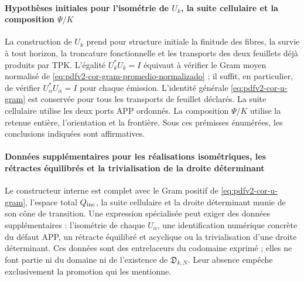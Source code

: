 \paragraph{Hypothèses initiales pour l'isométrie de \(U_k\), la suite cellulaire et la composition \(\Psi/K\)}
La construction de \(U_k\) prend pour structure initiale la finitude des fibres, la survie à tout horizon, la troncature fonctionnelle et les transports des deux feuillets déjà produits par TPK\@. L'égalité \(U_k^*U_k=I\) équivaut à vérifier le Gram moyen normalisé de \eqref{eq:pdfv2-cor-gram-promedio-normalizado} ; il suffit, en particulier, de vérifier \(U_\alpha^*U_\alpha=I\) pour chaque émission. L'identité générale \eqref{eq:pdfv2-cor-u-gram} est conservée pour tous les transports de feuillet déclarés. La suite cellulaire utilise les deux ports APP ordonnés. La composition \(\Psi/K\) utilise la retenue entière, l'orientation et la frontière. Sous ces prémisses énumérées, les conclusions indiquées sont affirmatives.

\paragraph{Données supplémentaires pour les réalisations isométriques, les rétractes équilibrés et la trivialisation de la droite déterminant}
Le constructeur interne est complet avec le Gram positif de \eqref{eq:pdfv2-cor-u-gram}, l'espace total \(Q_{\rm inc}\), la suite cellulaire et la droite déterminant munie de son cône de transition. Une expression spécialisée peut exiger des données supplémentaires : l'isométrie de chaque \(U_\alpha\), une identification numérique concrète du défaut APP, un rétracte équilibré et acyclique ou la trivialisation d'une droite déterminant. Ces données sont des entrelaceurs du codomaine exprimé ; elles ne font partie ni du domaine ni de l'existence de \(\mathfrak D_{k,N}\). Leur absence empêche exclusivement la promotion qui les mentionne.

